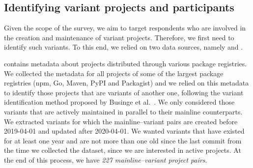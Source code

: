 

\subsection{Identifying variant projects and participants}
\label{sec:forks_and_participants}

Given the scope of the survey, we aim to target respondents who are involved in the creation and maintenance of variant projects.%
Therefore, we first need to identify such variants.
To this end, we relied on two data sources, namely \librariesio and \gh.

\librariesio contains metadata about projects distributed through various package registries. We collected the metadata for all projects of some of the largest package registries (\textsf{npm, Go, Maven, PyPI} and \textsf{Packagist}) and we relied on this metadata to identify those projects that are variants of another one, following the variant identification method proposed by  Businge et al.~\cite{businge:emse:2021,businge:benevol:2020}. %
We only considered those variants that are actively maintained in parallel to their mainline counterparts. We extracted variants for which the mainline--variant pairs are created before 2019-04-01 and updated after 2020-04-01. We wanted variants that have existed for at least one year and are not more than one old since the last commit from the time we collected the dataset, since we are interested in active projects.
At the end of this process, we have \textit{227 mainline–variant project pairs}.

